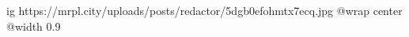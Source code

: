  
 
 
 
 

\ifcmt
  ig https://mrpl.city/uploads/posts/redactor/5dgb0efohmtx7ecq.jpg
  @wrap center
  @width 0.9
\fi
